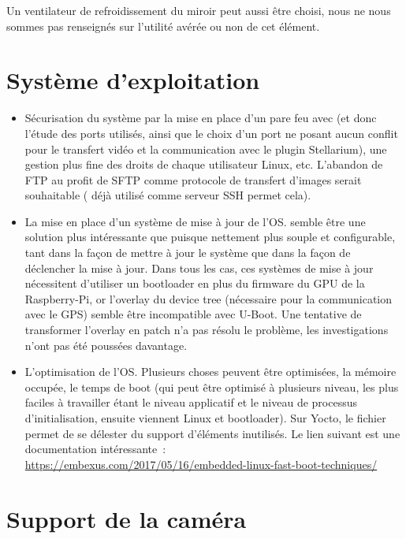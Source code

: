 Un ventilateur de refroidissement du miroir peut aussi être choisi, nous ne nous sommes pas renseignés sur l'utilité avérée ou non de cet élément.

\section{Système d'exploitation}

\begin{itemize}[label=$\bullet$]
	\item Sécurisation du système par la mise en place d'un pare feu avec  (et donc l'étude des ports utilisés, ainsi que le choix d'un port ne posant aucun conflit pour le transfert vidéo et la communication avec le plugin Stellarium), une gestion plus fine des droits de chaque utilisateur Linux, etc. L'abandon de FTP au profit de SFTP comme protocole de transfert d'images serait souhaitable ( déjà utilisé comme serveur SSH permet cela).
	\item La mise en place d'un système de mise à jour de l'OS.  semble être une solution plus intéressante que  puisque nettement plus souple et configurable, tant dans la façon de mettre à jour le système que dans la façon de déclencher la mise à jour. Dans tous les cas, ces systèmes de mise à jour nécessitent d'utiliser un bootloader en plus du firmware du GPU de la Raspberry-Pi, or l'overlay du device tree  (nécessaire pour la communication avec le GPS) semble être incompatible avec U-Boot. Une tentative de transformer l'overlay en patch n'a pas résolu le problème, les investigations n'ont pas été poussées davantage.
	\item L'optimisation de l'OS. Plusieurs choses peuvent être optimisées, la mémoire occupée, le temps de boot (qui peut être optimisé à plusieurs niveau, les plus faciles à travailler étant le niveau applicatif et le niveau de processus d'initialisation, ensuite viennent Linux et bootloader). Sur Yocto, le fichier  permet de se délester du support d'éléments inutilisés. Le lien suivant est une documentation intéressante~:\\\url{https://embexus.com/2017/05/16/embedded-linux-fast-boot-techniques/}
	\end{itemize}

\section{Support de la caméra}

